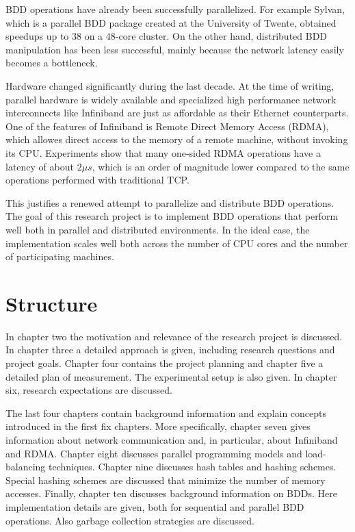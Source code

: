 BDD operations have already been successfully parallelized. For example Sylvan, which is a parallel BDD package created at the University of Twente, obtained speedups up to 38 on a 48-core cluster. On the other hand, distributed BDD manipulation has been less successful, mainly because the network latency easily becomes a bottleneck.

Hardware changed significantly during the last decade. At the time of writing, parallel hardware is widely available and specialized high performance network interconnects like Infiniband are just as affordable as their Ethernet counterparts. One of the features of Infiniband is Remote Direct Memory Access (RDMA), which allowes direct access to the memory of a remote machine, without invoking its CPU. Experiments show that many one-sided RDMA operations have a latency of about $2 \mu s$, which is an order of magnitude lower compared to the same operations performed with traditional TCP.

This justifies a renewed attempt to parallelize and distribute BDD operations. The goal of this research project is to implement BDD operations that perform well both in parallel and distributed environments. In the ideal case, the implementation scales well both across the number of CPU cores and the number of participating machines.

\section{Structure}
In chapter two the motivation and relevance of the research project is discussed. In chapter three a detailed approach is given, including research questions and project goals. Chapter four contains the project planning and chapter five a detailed plan of measurement. The experimental setup is also given. In chapter six, research expectations are discussed.

The last four chapters contain background information and explain concepts introduced in the first fix chapters. More specifically, chapter seven gives information about network communication and, in particular, about Infiniband and RDMA. Chapter eight discusses parallel programming models and load-balancing techniques. Chapter nine discusses hash tables and hashing schemes. Special hashing schemes are discussed that minimize the number of memory accesses. Finally, chapter ten discusses background information on BDDs. Here implementation details are given, both for sequential and parallel BDD operations. Also garbage collection strategies are discussed. 